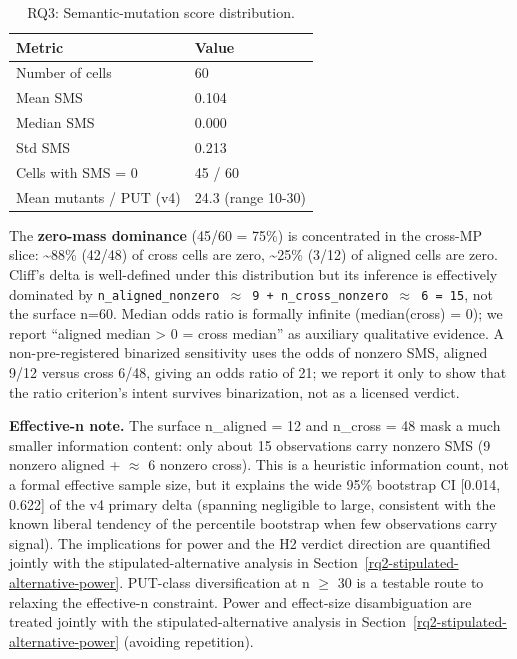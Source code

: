 \documentclass[manuscript,screen,review]{acmart}
\begin{document}
{%
\begin{longtable}[]{@{}ll@{}}
\caption{RQ3: Semantic-mutation score distribution.}\\
\toprule\noalign{}
Metric & Value \\
\midrule\noalign{}
\endhead
\bottomrule\noalign{}
\endlastfoot
Number of cells & 60 \\
Mean SMS & 0.104 \\
Median SMS & 0.000 \\
Std SMS & 0.213 \\
Cells with SMS = 0 & 45 / 60 \\
Mean mutants / PUT (v4) & 24.3 (range 10-30) \\
\end{longtable}
}

The \textbf{zero-mass dominance} (45/60 = 75\%) is concentrated in the
cross-MP slice: \textasciitilde88\% (42/48) of cross cells are zero,
\textasciitilde25\% (3/12) of aligned cells are zero. Cliff's delta is
well-defined under this distribution but its inference is effectively
dominated by
\texttt{n\_aligned\_nonzero\ $\approx$\ 9\ +\ n\_cross\_nonzero\ $\approx$\ 6\ =\ 15}, not the
surface n=60. Median odds ratio is formally infinite (median(cross) =
0); we report ``aligned median \textgreater{} 0 = cross median'' as
auxiliary qualitative evidence. A non-pre-registered binarized
sensitivity uses the odds of nonzero SMS, aligned 9/12 versus cross
6/48, giving an odds ratio of 21; we report it only to show that the
ratio criterion's intent survives binarization, not as a licensed
verdict.

\textbf{Effective-n note.} The surface n\_aligned = 12 and n\_cross = 48
mask a much smaller information content: only about 15 observations carry
nonzero SMS (9 nonzero aligned + $\approx$ 6 nonzero cross). This is a heuristic
information count, not a formal effective sample size, but it explains the
wide 95\% bootstrap CI {[}0.014, 0.622{]} of the v4 primary delta
(spanning negligible to large, consistent with the known liberal tendency of the percentile
bootstrap when few observations carry signal). The implications for power and the H2 verdict direction are
quantified jointly with the stipulated-alternative analysis in Section~\ref{rq2-stipulated-alternative-power}.
PUT-class diversification at n $\geq$ 30 is a testable route to relaxing
the effective-n constraint. Power and effect-size disambiguation are
treated jointly with the stipulated-alternative analysis in Section~\ref{rq2-stipulated-alternative-power}
(avoiding repetition).
\end{document}
